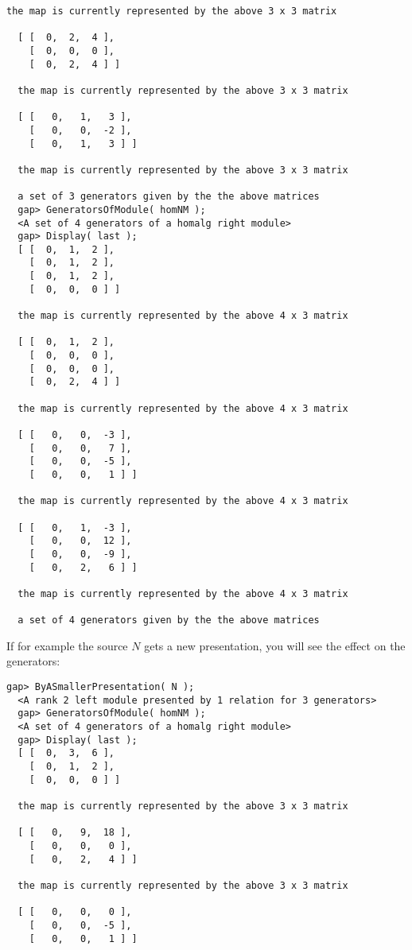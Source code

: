 \documentclass[a4paper,11pt]{report}
\begin{document}
{{{\begin{Verbatim}[fontsize=\small,frame=single,label=Example]
  the map is currently represented by the above 3 x 3 matrix
  
  [ [  0,  2,  4 ],
    [  0,  0,  0 ],
    [  0,  2,  4 ] ]
  
  the map is currently represented by the above 3 x 3 matrix
  
  [ [   0,   1,   3 ],
    [   0,   0,  -2 ],
    [   0,   1,   3 ] ]
  
  the map is currently represented by the above 3 x 3 matrix
  
  a set of 3 generators given by the the above matrices
  gap> GeneratorsOfModule( homNM );
  <A set of 4 generators of a homalg right module>
  gap> Display( last );
  [ [  0,  1,  2 ],
    [  0,  1,  2 ],
    [  0,  1,  2 ],
    [  0,  0,  0 ] ]
  
  the map is currently represented by the above 4 x 3 matrix
  
  [ [  0,  1,  2 ],
    [  0,  0,  0 ],
    [  0,  0,  0 ],
    [  0,  2,  4 ] ]
  
  the map is currently represented by the above 4 x 3 matrix
  
  [ [   0,   0,  -3 ],
    [   0,   0,   7 ],
    [   0,   0,  -5 ],
    [   0,   0,   1 ] ]
  
  the map is currently represented by the above 4 x 3 matrix
  
  [ [   0,   1,  -3 ],
    [   0,   0,  12 ],
    [   0,   0,  -9 ],
    [   0,   2,   6 ] ]
  
  the map is currently represented by the above 4 x 3 matrix
  
  a set of 4 generators given by the the above matrices
\end{Verbatim}
 If for example the source $N$ gets a new presentation, you will see the effect on the generators: 
\begin{Verbatim}[fontsize=\small,frame=single,label=Example]
  gap> ByASmallerPresentation( N );
  <A rank 2 left module presented by 1 relation for 3 generators>
  gap> GeneratorsOfModule( homNM );
  <A set of 4 generators of a homalg right module>
  gap> Display( last );
  [ [  0,  3,  6 ],
    [  0,  1,  2 ],
    [  0,  0,  0 ] ]
  
  the map is currently represented by the above 3 x 3 matrix
  
  [ [   0,   9,  18 ],
    [   0,   0,   0 ],
    [   0,   2,   4 ] ]
  
  the map is currently represented by the above 3 x 3 matrix
  
  [ [   0,   0,   0 ],
    [   0,   0,  -5 ],
    [   0,   0,   1 ] ]
  

\end{Verbatim}}}}
\end{document}
